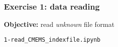\begin{frame}[c, fragile]
\frametitle{Exercise 1: data reading}

\textbf{Objective:} read \textit{unknown} file format

\vspace{1cm}

\exercise \verb|1-read_CMEMS_indexfile.ipynb|

\end{frame}

